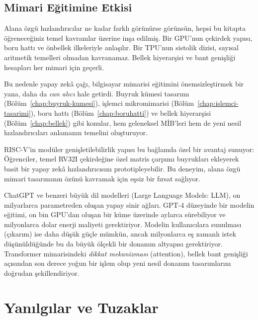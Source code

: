 \subsection{Mimari Eğitimine Etkisi}
\label{sec:degisim-egitim}

Alana özgü hızlandırıcılar ne kadar farklı görünürse görünsün, hepsi bu kitapta öğreneceğiniz temel kavramlar üzerine inşa edilmiş. Bir GPU'nun çekirdek yapısı, boru hattı ve önbellek ilkeleriyle anlaşılır. Bir TPU'nun sistolik dizisi, sayısal aritmetik temelleri olmadan kavranamaz. Bellek hiyerarşisi ve bant genişliği hesapları her mimari için geçerli.

Bu nedenle yapay zekâ çağı, bilgisayar mimarisi eğitimini önemsizleştirmek bir yana, daha da \emph{can alıcı} hale getirdi. Buyruk kümesi tasarımı (Bölüm~\ref{chap:buyruk-kumesi}), işlemci mikromimarisi (Bölüm~\ref{chap:islemci-tasarimi}), boru hattı (Bölüm~\ref{chap:boruhatti}) ve bellek hiyerarşisi (Bölüm~\ref{chap:bellek}) gibi konular, hem geleneksel MİB'leri hem de yeni nesil hızlandırıcıları anlamanın temelini oluşturuyor.

RISC-V'in modüler genişletilebilirlik yapısı bu bağlamda özel bir avantaj sunuyor: Öğrenciler, temel RV32I çekirdeğine özel matris çarpımı buyrukları ekleyerek basit bir yapay zekâ hızlandırıcısını prototipleyebilir. Bu deneyim, alana özgü mimari tasarımının özünü kavramak için eşsiz bir fırsat sağlıyor.

\begin{bilginot}
ChatGPT ve benzeri büyük dil modelleri (Large Language Models: LLM), on milyarlarca parametreden oluşan yapay sinir ağları. GPT-4 düzeyinde bir modelin eğitimi, on bin GPU'dan oluşan bir küme üzerinde aylarca sürebiliyor ve milyonlarca dolar enerji maliyeti gerektiriyor. Modelin kullanıcılara sunulması (çıkarım) ise daha düşük güçle mümkün, ancak milyonlarca eş zamanlı istek düşünüldüğünde bu da büyük ölçekli bir donanım altyapısı gerektiriyor. Transformer mimarisindeki \emph{dikkat mekanizması} (attention), bellek bant genişliği açısından son derece yoğun bir işlem olup yeni nesil donanım tasarımlarını doğrudan şekillendiriyor.
\end{bilginot}


\section{Yanılgılar ve Tuzaklar}
\label{sec:giris-yanilgilar}

